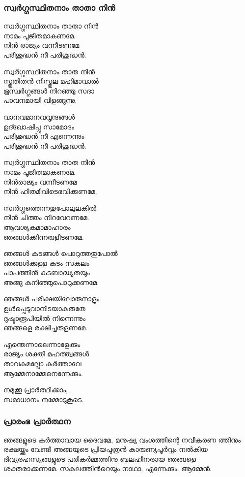 \documentclass[20pt]{beamer}
\newcommand{\Priest}[1]{\color{white}#1}
\newcommand{\People}[1]{\color{yellow}#1}
\newcommand{\Server}[1]{\color{lightgray}#1}
\newcommand{\Ammen}{\People{ആമ്മേന്‍.}}
\newcommand{\LetsPray}{\Server{നമുക്കൂ പ്രാര്‍ത്ഥിക്കാം,\\ സമാധാനം നമ്മോടുകൂടെ.}}
\begin{document}
\begin{frame}[allowframebreaks]
\frametitle{സ്വര്‍ഗ്ഗസ്ഥിതനാം താതാ നിന്‍}
\Priest{
സ്വര്‍ഗ്ഗസ്ഥിതനാം താതാ നിന്‍\\
നാമം പൂജിതമാകണമേ.\\
നിന്‍ രാജ്യം വന്നീടണമേ\\
പരിശുദ്ധന്‍ നീ പരിശുദ്ധന്‍.}\par
\People{
സ്വര്‍ഗ്ഗസ്ഥിതനാം താത നിന്‍\\
സ്തുതിതന്‍ നിസ്തുല മഹിമാവാല്‍\\
ഭൂസ്വര്‍ഗ്ഗങ്ങള്‍ നിറഞ്ഞു സദാ\\
പാവനമായി വിളങ്ങുന്നു.\par
\framebreak
വാനവമാനവവൃന്ദങ്ങള്‍\\
ഉദ്ഖോഷിപ്പു സാമോദം\\
പരിശുദ്ധന്‍ നീ എന്നെന്നും\\
പരിശുദ്ധന്‍ നീ പരിശുദ്ധന്‍.\par
സ്വര്‍ഗ്ഗസ്ഥിതനാം താത നിന്‍\\
നാമം പൂജിതമാകണമേ.\\ 
നിന്‍രാജ്യം വന്നീടണമേ\\
നിന്‍ ഹിതമിവിടെഭവിക്കണമേ.\par
\framebreak
സ്വര്‍ഗ്ഗത്തെന്നതുപോലുലകില്‍\\
നിന്‍ ചിത്തം നിറവേറണമേ.\\
ആവശ്യകമാമാഹാരം\\
ഞങ്ങള്‍ക്കിന്നരുളീടണമേ.\par
ഞങ്ങള്‍ കടങ്ങള്‍ പൊറുത്തതുപോല്‍\\
ഞങ്ങള്‍ക്കുള്ള കടം സകലം\\ 
പാപത്തിന്‍ കടബാദ്ധ്യതയും\\ 
അങ്ങു കനിഞ്ഞുപൊറുക്കണമേ.\par
\framebreak
ഞങ്ങള്‍ പരീക്ഷയിലോരുനാളും\\
ഉള്‍പ്പെടുവാനിടയാകരുതേ\\ 
ദുഷ്ടാരൂപിയില്‍ നിന്നെന്നും\\ 
ഞങ്ങളെ രക്ഷിച്ചരുളണമേ.\par
എന്തെന്നാലെന്നാളേക്കും\\ 
രാജ്യം ശക്തി മഹത്ത്വങ്ങള്‍\\
താവകമല്ലോ കര്‍ത്താവേ\\
ആമ്മേനാമ്മേനെന്നേക്കും.}
\end{frame}

\begin{frame}
\LetsPray
\end{frame}

\begin{frame}[allowframebreaks]
\frametitle{പ്രാരംഭ പ്രാര്‍ത്ഥന}
\Priest{
ഞങ്ങളുടെ കര്‍ത്താവായ ദൈവമേ, മനുഷ്യ വംശത്തിന്റെ
നവീകരണ ത്തിനും രക്ഷയ്ക്കും വേണ്ടി അങ്ങയുടെ പ്രിയപുത്രന്‍
കാരുണ്യപൂര്‍വ്വം നല്‍കിയ ദിവ്യരഹസ്യങ്ങളുടെ
പരികര്‍മ്മത്തിനു ബലഹീനരായ ഞങ്ങളെ ശക്തരാക്കണമേ.
സകലത്തിന്‍റെയും നാഥാ, എന്നേക്കും.} \Ammen
\end{frame}
\end{document}
